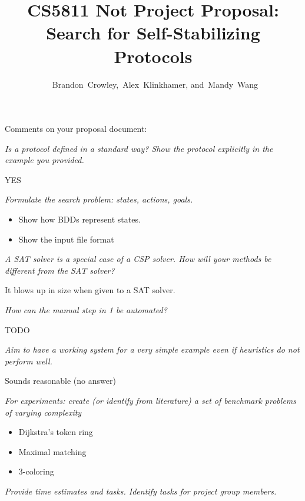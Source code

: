 


\usepackage{tikz}
\usetikzlibrary{arrows}


\title{
 CS5811 Not Project Proposal:\\
 Search for Self-Stabilizing Protocols
}

\author{~Brandon~Crowley,~Alex~Klinkhamer, and~Mandy~Wang}
\maketitle



Comments on your proposal document:

{\it Is a protocol defined in a standard way? Show the protocol explicitly in the example you provided.}

YES

{\it Formulate the search problem: states, actions, goals.
\begin{itemize}
\item Show how BDDs represent states.
\item Show the input file format
\end{itemize}
}

{\it A SAT solver is a special case of a CSP solver. How will your methods be different from the SAT solver?}

It blows up in size when given to a SAT solver.

{\it How can the manual step in 1 be automated?}

TODO

{\it Aim to have a working system for a very simple example even if heuristics do not perform well.}

Sounds reasonable (no answer)

{\it For experiments: create (or identify from literature) a set of benchmark problems of varying complexity}

\begin{itemize}
\item Dijkstra's token ring
\item Maximal matching
\item 3-coloring
\end{itemize}

{\it Provide time estimates and tasks. Identify tasks for project group members.}




